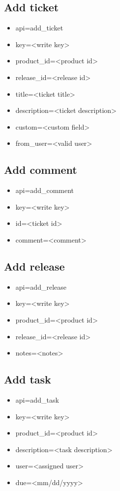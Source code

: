 \documentclass[11pt]{article}
\begin{document}
\subsection{Add ticket}

\begin{itemize}
\item api=add\_ticket
\item key=<write key>
\item product\_id=<product id>
\item release\_id=<release id>
\item title=<ticket title>
\item description=<ticket description>
\item custom=<custom field>
\item from\_user=<valid user>
\end{itemize}

\subsection{Add comment}

\begin{itemize}
\item api=add\_comment
\item key=<write key>
\item id=<ticket id>
\item comment=<comment>
\end{itemize}

\subsection{Add release}

\begin{itemize}
\item api=add\_release
\item key=<write key>
\item product\_id=<product id>
\item release\_id=<release id>
\item notes=<notes>
\end{itemize}

\subsection{Add task}

\begin{itemize}
\item api=add\_task
\item key=<write key>
\item product\_id=<product id>
\item description=<task description>
\item user=<assigned user>
\item due=<mm/dd/yyyy>
\end{itemize}
\end{document}
